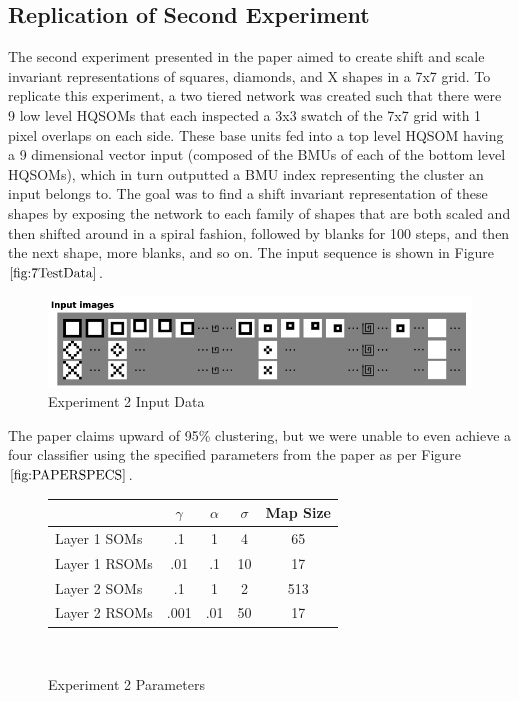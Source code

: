 \documentclass[a4paper,10pt]{article}
\begin{document}
\subsection{Replication of Second Experiment}
The second experiment presented in the paper aimed to create shift and scale invariant
representations of squares, diamonds, and X shapes in a 7x7 grid.  To replicate this experiment, a
two tiered network was created such that there were 9 low level HQSOMs that each inspected a 3x3
swatch of the 7x7 grid with 1 pixel overlaps on each side.  These base units fed into a top level
HQSOM having a 9 dimensional vector input (composed of the BMUs of each of the bottom level HQSOMs),
which in turn
outputted a BMU index representing the cluster an input belongs to. The goal was to find a shift
invariant representation of these shapes by exposing the network to each family of shapes that
are both scaled and then shifted around in a spiral fashion, followed by blanks for 100 steps,
and then the next shape, more blanks, and so on.  The input sequence is shown in Figure
$\ref{fig:7TestData}$.
\begin{figure}[ht]
\begin{center}
 \includegraphics[scale=.3]{./exp2_dataset.png}
\end{center}
\caption{Experiment 2 Input Data}
\label{fig:7TestData}
\end{figure} 

The paper claims upward of 95\% clustering, but we were unable to even achieve a four
classifier using the specified parameters from the paper as per Figure $\ref{fig:PAPERSPECS}$. 
\begin{figure}[ht] 
 \begin{center}
  \begin{tabular}{ | l | c | c | c | c | }
    \hline
    & $\gamma$ & $\alpha$ & $\sigma$ & Map Size\\ \hline
    Layer 1 SOMs  & .1   & 1   & 4  & 65\\ \hline
    Layer 1 RSOMs & .01  & .1  & 10 & 17\\ \hline
    Layer 2 SOMs  & .1   & 1   & 2  & 513\\ \hline
    Layer 2 RSOMs &  .001 & .01 & 50 & 17 \\
    \hline
  \end{tabular}
\caption{Experiment 2 Parameters}
\label{fig:PAPERSPECS}
\end{center}
\
\end{figure}
\end{document}
